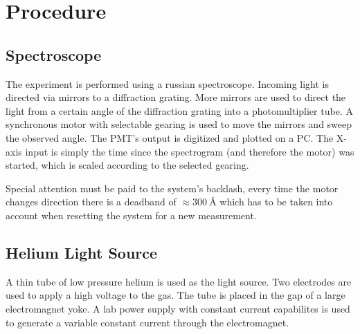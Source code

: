 \chapter{Procedure}

\section{Spectroscope}
The experiment is performed using a russian spectroscope.
Incoming light is directed via mirrors to a diffraction grating.
More mirrors are used to direct the light from a certain angle of the diffraction grating into a photomultiplier tube.
A synchronous motor with selectable gearing is used to move the mirrors and sweep the observed angle.
The PMT's output is digitized and plotted on a PC.
The X-axis input is simply the time since the spectrogram (and therefore the motor) was started, which is scaled according to the selected gearing.

Special attention must be paid to the system's backlash, every time the motor changes direction there is a deadband of $\approx\SI{300}{\angstrom}$ which has to be taken into account when resetting the system for a new measurement.

\section{Helium Light Source}
A thin tube of low pressure helium is used as the light source.
Two electrodes are used to apply a high voltage to the gas.
The tube is placed in the gap of a large electromagnet yoke.
A lab power supply with constant current capabilites is used to generate a variable constant current through the electromagnet.
